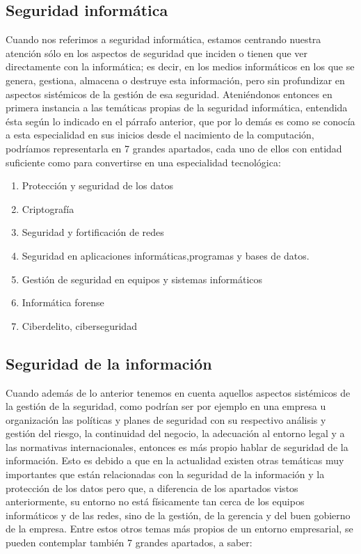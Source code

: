 \documentclass[10pt,a4paper]{book}
\begin{document}
\subsection*{Seguridad informática}
Cuando nos referimos a seguridad informática, estamos centrando nuestra atención sólo en los aspectos de seguridad que inciden o tienen que ver directamente con la informática; es decir, en los medios informáticos en los que se genera, gestiona, almacena o destruye esta información, pero sin profundizar en aspectos sistémicos de la gestión de esa seguridad. Ateniéndonos entonces en primera instancia a las temáticas propias de la seguridad informática, entendida ésta según lo indicado en el párrafo anterior, que por lo demás es como se conocía a esta especialidad en sus inicios desde el nacimiento de la computación, podríamos representarla en 7 grandes apartados, cada uno de ellos con entidad suficiente como para convertirse en una especialidad tecnológica:
\begin{enumerate}
\item Protección y seguridad de los datos
\item Criptografía
\item Seguridad y fortificación de redes
\item Seguridad en aplicaciones informáticas,programas y bases de datos.
\item Gestión de seguridad en equipos y sistemas informáticos
\item Informática forense
\item Ciberdelito, ciberseguridad
\end{enumerate}
\subsection*{Seguridad de la información}
Cuando además de lo anterior tenemos en cuenta aquellos aspectos sistémicos de la gestión de la seguridad, como podrían ser por ejemplo en una empresa u organización las políticas y planes de seguridad con su respectivo análisis y gestión del riesgo, la continuidad del negocio, la adecuación al entorno legal y a las normativas internacionales, entonces es más propio hablar de seguridad de la información. Esto es debido a que en la actualidad existen otras temáticas muy importantes que están relacionadas con la seguridad de la información y la protección de los datos pero que, a diferencia de los apartados vistos anteriormente, su entorno no está físicamente tan cerca de los equipos informáticos y de las redes, sino de la gestión, de la gerencia y del buen gobierno de la empresa. Entre estos otros temas más propios de un entorno empresarial, se pueden contemplar también 7 grandes apartados, a saber:
\end{document}

